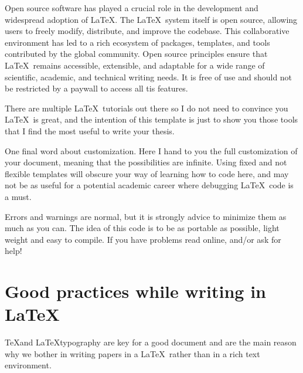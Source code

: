 Open source software has played a crucial role in the development and widespread adoption of \LaTeX. The \LaTeX\ system itself is open source, allowing users to freely modify, distribute, and improve the codebase. This collaborative environment has led to a rich ecosystem of packages, templates, and tools contributed by the global community. Open source principles ensure that \LaTeX\ remains accessible, extensible, and adaptable for a wide range of scientific, academic, and technical writing needs. It is free of use and should not be restricted by a paywall to access all tis features.

There are multiple \LaTeX\ tutorials out there so I do not need to convince you \LaTeX\ is great, and the intention of this template is just to show you those tools that I find the most useful to write your thesis. 

One final word about customization. Here I hand to you the full customization of your document, meaning that the possibilities are infinite. Using fixed and not flexible templates will obscure your way of learning how to code here, and may not be as useful for a potential academic career where debugging \LaTeX\ code is a must.

Errors and warnings are normal, but it is strongly advice to minimize them as much as you can. The idea of this code is to be as portable as possible, light weight and easy to compile. If you have problems read online, and/or ask for help!

\section{Good practices while writing in \LaTeX}

\TeX and \LaTeX typography are key for a good document and are the main reason why we bother in writing papers in a \LaTeX\ rather than in a rich text environment.

